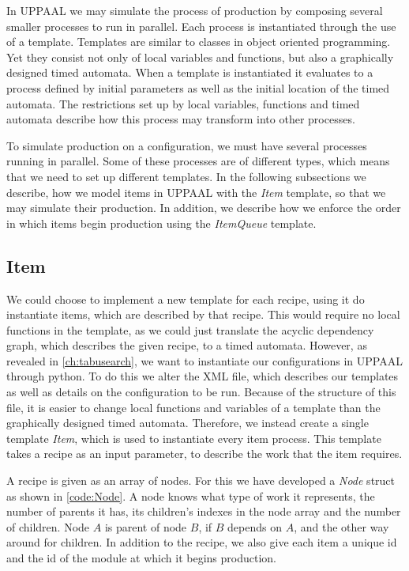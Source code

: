 In UPPAAL we may simulate the process of production by composing several smaller processes to run in parallel. Each process is instantiated through the use of a template. Templates are similar to classes in object oriented programming. Yet they consist not only of local variables and functions, but also a graphically designed timed automata. When a template is instantiated it evaluates to a process defined by initial parameters as well as the initial location of the timed automata. The restrictions set up by local variables, functions and timed automata  describe how this process may transform into other processes.   

To simulate production on a configuration, we must have several processes running in parallel. Some of these processes are of different types, which means that we need to set up different templates. In the following subsections we describe, how we model items in UPPAAL with the \textit{Item} template, so that we may simulate their production. In addition, we describe how we enforce the order in which items begin production using the \textit{ItemQueue} template.

\subsection{Item}\label{subs:recipe}
We could choose to implement a new template for each recipe, using it do instantiate items, which are described by that recipe. This would require no local functions in the template, as we could just translate the acyclic dependency graph, which describes the given recipe, to a timed automata. However, as revealed in \cref{ch:tabusearch}, we want to  instantiate our configurations in UPPAAL through python. To do this we alter the XML file, which describes our templates as well as details on the configuration to be run. Because of the structure of this file, it is easier to change local functions and variables of a template than the graphically designed timed automata. Therefore, we instead create a single template \textit{Item}, which is used to instantiate every item process. This template takes a recipe as an input parameter, to describe the work that the item requires.

A recipe is given as an array of nodes. For this we have developed a \textit{Node} struct as shown in \cref{code:Node}. A node knows what type of work it represents, the number of parents it has, its children's indexes in the node array and the number of children. Node $A$ is parent of node $B$, if $B$ depends on $A$, and the other way around for children. In addition to the recipe, we also give each item a unique id and the id of the module at which it begins production. 

